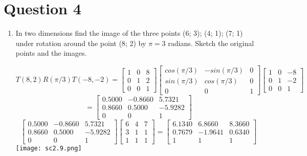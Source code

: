 \documentclass{article}
\begin{document}
\section{Question 4}
\begin{enumerate}
\item In two dimensions find the image of the three points (6; 3); (4; 1); (7; 1)
under rotation around the point (8; 2) by $\pi=3$ radians. Sketch the original points
and the images.

 $$T(8, 2)R(\pi/3)T(-8, −2) =\left[ \begin{matrix} 1 & 0 & 8 \\ 0 &1 & 2\\ 0 & 0 &1 \end{matrix} \right] \left[ \begin{matrix} cos(\pi/3) & -sin(\pi/3) &0 \\ sin(\pi/3)&cos(\pi /3) & 0\\ 0&0 &1 \end{matrix} \right]\left[ \begin{matrix} 1 & 0 &-8 \\ 0&1 & -2\\ 0&0 &1 \end{matrix} \right]$$$$= \left[ \begin{matrix} 0.5000 & -0.8660 &5.7321 \\ 0.8660&0.5000 & -5.9282\\ 0&0 &1 \end{matrix} \right]$$ $$\left[ \begin{matrix} 0.5000 & -0.8660 &5.7321 \\ 0.8660&0.5000 & -5.9282\\ 0&0 &1 \end{matrix} \right]\left[ \begin{matrix} 6& 4 &7\\ 3&1& 1\\ 1&1 &1 \end{matrix} \right]=\left[ \begin{matrix} 6.1340 & 6.8660 & 8.3660 \\ 0.7679 & -1.9641 & 0.6340\\ 1&1 &1 \end{matrix} \right]$$
\texttt{[image: sc2.9.png]}
\end{enumerate}
\end{document}
